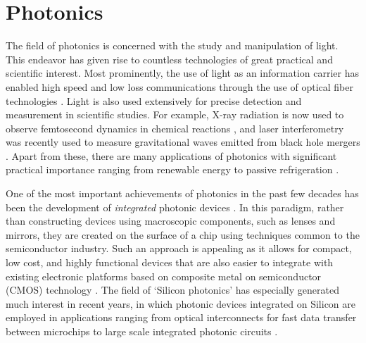 
\section{Photonics}


The field of photonics is concerned with the study and manipulation of light.
This endeavor has given rise to countless technologies of great practical and scientific interest.
Most prominently, the use of light as an information carrier has enabled high speed and low loss communications through the use of optical fiber technologies \cite{agrawal_fiber-optic_2012}.
Light is also used extensively for precise detection and measurement in  scientific studies.  
For example, X-ray radiation is now used to observe femtosecond dynamics in chemical reactions \cite{kern_structures_2018}, and laser interferometry was recently used to measure gravitational waves emitted from black hole mergers \cite{ligo_scientific_collaboration_and_virgo_collaboration_observation_2016}.
Apart from these, there are many applications of photonics with significant practical importance ranging from renewable energy \cite{carlson_amorphous_1976,yu_fundamental_2010} to passive refrigeration \cite{raman_passive_2014,hsu_radiative_2016}.

One of the most important achievements of photonics in the past few decades has been the development of \textit{integrated} photonic devices \cite{pollock_integrated_2010}.
In this paradigm, rather than constructing devices using macroscopic components, such as lenses and mirrors, they are created on the surface of a chip using techniques common to the semiconductor industry.
Such an approach is appealing as it allows for compact, low cost, and highly functional devices that are also easier to integrate with existing electronic platforms based on composite metal on semiconductor (CMOS) technology \cite{weste_principles_1985}.
The field of `Silicon photonics' has especially generated much interest in recent years, in which photonic devices integrated on Silicon are employed in applications ranging from optical interconnects for fast data transfer between microchips to large scale integrated photonic circuits \cite{jalali_silicon_2006}.

